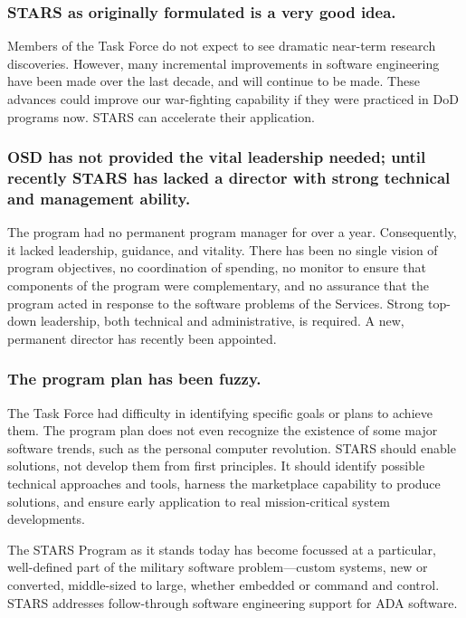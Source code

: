 \documentclass[11pt,final]{article}
\begin{document}
\subsubsection*{STARS as originally formulated is a very good idea.}

Members of the Task Force do not expect to see dramatic near-term research
discoveries. However, many incremental improvements in software engineering
have been made over the last decade, and will continue to be made. These
advances could improve our war-fighting capability if they were practiced in
DoD programs now. STARS can accelerate their application.

\subsubsection*{OSD has not provided the vital leadership needed; until recently
STARS has lacked a director with strong technical and management ability.}

The program had no permanent program manager for over a year. Consequently, it
lacked leadership, guidance, and vitality. There has been no single vision of
program objectives, no coordination of spending, no monitor to ensure that
components of the program were complementary, and no assurance that the program
acted in response to the software problems of the Services. Strong top-down
leadership, both technical and administrative, is required. A new, permanent
director has recently been appointed.

\subsubsection*{The program plan has been fuzzy.}

The Task Force had difficulty in identifying specific goals or plans to achieve
them. The program plan does not even recognize the existence of some major
software trends, such as the personal computer revolution. STARS should enable
solutions, not develop them from first principles. It should identify possible
technical approaches and tools, harness the marketplace capability to produce
solutions, and ensure early application to real mission-critical system
developments.

The STARS Program as it stands today has become focussed at a particular,
well-defined part of the military software problem—custom systems, new or
converted, middle-sized to large, whether embedded or command and control.
STARS addresses follow-through software engineering support for ADA software.
\end{document}
